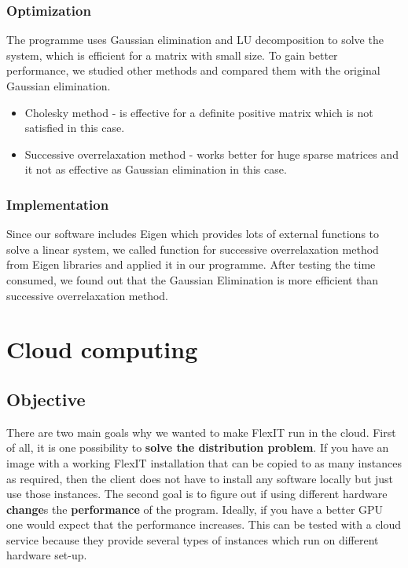 \documentclass[a4paper, 11pt, article]{report}
\begin{document}
\subsubsection{Optimization}

The programme uses Gaussian elimination and LU decomposition to solve the system, which is efficient for a matrix with small size. To gain better performance, we studied other methods and compared them with the original Gaussian elimination.

\begin{itemize}
\item Cholesky method - is effective for a definite positive matrix which is not satisfied in this case.
\item Successive overrelaxation method - works better for huge sparse matrices and it not as effective as Gaussian elimination in this case.
\end{itemize}

\subsubsection{Implementation}

Since our software includes Eigen which provides lots of external functions to solve a linear system, we called function for successive overrelaxation method from Eigen libraries and applied it in our programme. After testing the time consumed, we found out that the Gaussian Elimination is more efficient than successive overrelaxation method.

\section{Cloud computing}

\subsection{Objective}

There are two main goals why we wanted to make FlexIT run in the cloud. First of all, it is one possibility to \textbf{solve the distribution problem}. If you have an image with a working FlexIT installation that can be copied to as many instances as required, then the client does not have to install any software locally but just use those instances. The second goal is to figure out if using different hardware \textbf{change}s the \textbf{performance} of the program. Ideally, if you have a better GPU one would expect that the performance increases. This can be tested with a cloud service because they provide several types of instances which run on different hardware set-up. 
\end{document}
